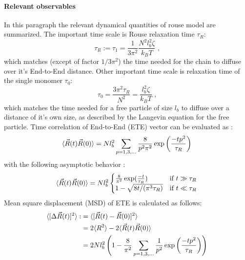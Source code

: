 \documentclass[
    paper=A4,pagesize=automedia,fontsize=12pt,
    BCOR=15mm,DIV=22,
    twoside,headinclude,footinclude=false,
    fleqn,             %
    bibliography=totocnumbered,          %
    listof=totoc,                %
    listof=flat,                 %
    cleardoublepage=empty      %
    numbers=endperiod
]{scrartcl}
\begin{document}
\paragraph{Relevant observables}
In this paragraph the relevant dynamical quantities of rouse model are summarized. 
The important time scale is Rouse relaxation time $\tau_R$:
\begin{equation} \label{eq:rouse_relaxation_time}
    \tau_R := \tau_1 = \frac{1}{3 \pi^2} \frac{N^2 l_b^2 \zeta}{k_B T} \text{ ,}
\end{equation}
which matches (except of factor $1/3\pi^2$) the time needed for the chain to diffuse over 
it's End-to-End distance. Other important time scale is relaxation time of the single monomer $\tau_0$:
\begin{equation} \label{eq:rouse_tau_0}
    \tau_0 = \frac{3 \pi^2 \tau_R}{N^2} = \frac{l_b^2 \zeta}{k_B T} \text{ ,}
\end{equation}
which matches the time needed for a free particle of size $l_b$ to diffuse over a distance
of it's own size, as described by the Langevin equation for the free particle.
Time correlation of End-to-End (ETE) vector can be evaluated as \cite{Doi_Edwards_PD:1994}:
\begin{equation}
    \langle\vec{R}(t)\vec{R}(0)\rangle = Nl_b^2 \sum_{p=1,3,\ldots} \frac{8}{p^2\pi^2}\exp\left(\frac{-t p^2}{\tau_R}\right)
\end{equation}
with the following asymptotic behavior \cite{Nikoubashman2016}:
\begin{equation}
    \langle\vec{R}(t)\vec{R}(0)\rangle = Nl_b^2 \begin{cases}
        \frac{8}{\pi^2} \exp(\frac{-t}{\tau_R}) & \text{if } t \gg \tau_R \\
        1 - \sqrt{8t/(\pi^3\tau_R)} & \text{if } t \ll \tau_R
    \end{cases}
\end{equation}
Mean square displacement (MSD) of ETE is calculated as follows:
\begin{equation} \label{eq:rouse_msd_ete}
    \begin{aligned}
        \langle[\Delta \vec{R}(t)]^2\rangle :&= \langle[\vec{R}(t)-\vec{R}(0)]^2\rangle \\
        & = 2\langle R^2\rangle - 2 \langle\vec{R}(t)\vec{R}(0)\rangle \\
        & = 2 N l_b^2 \left(1 - \frac{8}{\pi^2}\sum_{p=1,3,\ldots}\frac{1}{p^2} \exp\left(\frac{-tp^2}{\tau_R}\right)\right)
    \end{aligned}
\end{equation}
\end{document}
